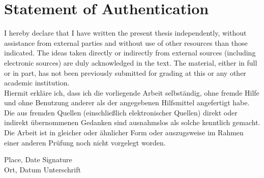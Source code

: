 \chapter* {Statement of Authentication}

I hereby declare that I have written the present thesis independently, without assistance from external parties and without use of other resources than those indicated. The ideas taken directly or indirectly from external sources (including electronic sources) are duly acknowledged in the text. The material, either in full or in part, has not been previously submitted for grading at this or any other academic institution.\\[1cm]

\noindent Hiermit erkläre ich, dass ich die vorliegende Arbeit selbständig, ohne fremde Hilfe und ohne Benutzung anderer als der angegebenen Hilfsmittel angefertigt habe. Die aus fremden Quellen (einschließlich elektronischer Quellen) direkt oder indirekt übernommenen Gedanken sind ausnahmslos als solche kenntlich  gemacht. Die Arbeit ist in gleicher oder ähnlicher Form oder auszugsweise im Rahmen einer anderen Prüfung noch nicht vorgelegt worden.\\[3cm]


\begin {flushleft}
	Place, Date \hspace{4.1cm}Signature\\
	\noindent Ort, Datum \hspace{4cm}Unterschrift\\
\end {flushleft}